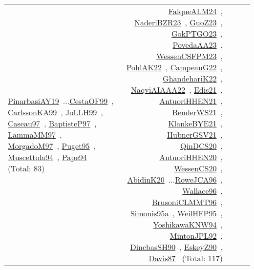 {\begin{longtable}{p{3cm}r>{\raggedright\arraybackslash}p{6cm}>{\raggedright\arraybackslash}p{6cm}>{\raggedright\arraybackslash}p{8cm}}
\href{../works/PinarbasiAY19.pdf}{PinarbasiAY19}~\cite{PinarbasiAY19}...\href{../works/CestaOF99.pdf}{CestaOF99}~\cite{CestaOF99}, \href{../works/CarlssonKA99.pdf}{CarlssonKA99}~\cite{CarlssonKA99}, \href{../works/JoLLH99.pdf}{JoLLH99}~\cite{JoLLH99}, \href{../works/Caseau97.pdf}{Caseau97}~\cite{Caseau97}, \href{../works/BaptisteP97.pdf}{BaptisteP97}~\cite{BaptisteP97}, \href{../works/LammaMM97.pdf}{LammaMM97}~\cite{LammaMM97}, \href{../works/MorgadoM97.pdf}{MorgadoM97}~\cite{MorgadoM97}, \href{../works/Puget95.pdf}{Puget95}~\cite{Puget95}, \href{../works/Muscettola94.pdf}{Muscettola94}~\cite{Muscettola94}, \href{../works/Pape94.pdf}{Pape94}~\cite{Pape94} (Total: 83) & \href{../works/FalqueALM24.pdf}{FalqueALM24}~\cite{FalqueALM24}, \href{../works/NaderiBZR23.pdf}{NaderiBZR23}~\cite{NaderiBZR23}, \href{../works/GuoZ23.pdf}{GuoZ23}~\cite{GuoZ23}, \href{../works/GokPTGO23.pdf}{GokPTGO23}~\cite{GokPTGO23}, \href{../works/PovedaAA23.pdf}{PovedaAA23}~\cite{PovedaAA23}, \href{../works/WessenCSFPM23.pdf}{WessenCSFPM23}~\cite{WessenCSFPM23}, \href{../works/PohlAK22.pdf}{PohlAK22}~\cite{PohlAK22}, \href{../works/CampeauG22.pdf}{CampeauG22}~\cite{CampeauG22}, \href{../works/GhandehariK22.pdf}{GhandehariK22}~\cite{GhandehariK22}, \href{../works/NaqviAIAAA22.pdf}{NaqviAIAAA22}~\cite{NaqviAIAAA22}, \href{../works/Edis21.pdf}{Edis21}~\cite{Edis21}, \href{../works/AntuoriHHEN21.pdf}{AntuoriHHEN21}~\cite{AntuoriHHEN21}, \href{../works/BenderWS21.pdf}{BenderWS21}~\cite{BenderWS21}, \href{../works/KlankeBYE21.pdf}{KlankeBYE21}~\cite{KlankeBYE21}, \href{../works/HubnerGSV21.pdf}{HubnerGSV21}~\cite{HubnerGSV21}, \href{../works/QinDCS20.pdf}{QinDCS20}~\cite{QinDCS20}, \href{../works/AntuoriHHEN20.pdf}{AntuoriHHEN20}~\cite{AntuoriHHEN20}, \href{../works/WessenCS20.pdf}{WessenCS20}~\cite{WessenCS20}, \href{../works/AbidinK20.pdf}{AbidinK20}~\cite{AbidinK20}...\href{../works/RoweJCA96.pdf}{RoweJCA96}~\cite{RoweJCA96}, \href{../works/Wallace96.pdf}{Wallace96}~\cite{Wallace96}, \href{../works/BrusoniCLMMT96.pdf}{BrusoniCLMMT96}~\cite{BrusoniCLMMT96}, \href{../works/Simonis95a.pdf}{Simonis95a}~\cite{Simonis95a}, \href{../works/WeilHFP95.pdf}{WeilHFP95}~\cite{WeilHFP95}, \href{../works/YoshikawaKNW94.pdf}{YoshikawaKNW94}~\cite{YoshikawaKNW94}, \href{../works/MintonJPL92.pdf}{MintonJPL92}~\cite{MintonJPL92}, \href{../works/DincbasSH90.pdf}{DincbasSH90}~\cite{DincbasSH90}, \href{../works/EskeyZ90.pdf}{EskeyZ90}~\cite{EskeyZ90}, \href{../works/Davis87.pdf}{Davis87}~\cite{Davis87} (Total: 117)\\

\end{longtable}}
